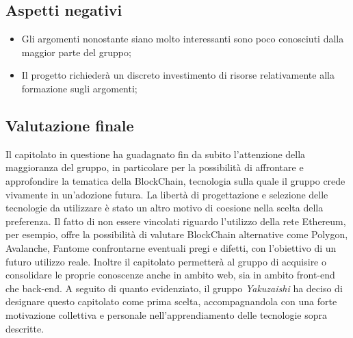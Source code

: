 \subsection{Aspetti negativi}
\begin{itemize}
	\item Gli argomenti nonostante siano molto interessanti sono poco conosciuti dalla maggior parte del gruppo;
	\item Il progetto richiederà un discreto investimento di risorse relativamente alla formazione sugli argomenti;
\end{itemize}

\subsection{Valutazione finale}
Il capitolato in questione ha guadagnato fin da subito l'attenzione della maggioranza del gruppo, in particolare per la possibilità di affrontare e approfondire la tematica della BlockChain, tecnologia sulla quale il gruppo crede vivamente in un'adozione futura.
La libertà di progettazione e selezione delle tecnologie da utilizzare è stato un altro motivo di coesione nella scelta della preferenza. Il fatto di non essere vincolati riguardo l'utilizzo della rete Ethereum, per esempio, offre la possibilità di valutare BlockChain
alternative come Polygon\glo, Avalanche\glo, Fantom\glo e confrontarne eventuali pregi e difetti, con l'obiettivo di un futuro utilizzo reale.
\newline
Inoltre il capitolato permetterà al gruppo di acquisire o consolidare le proprie conoscenze anche in ambito web, sia in ambito front-end che back-end. A seguito di quanto evidenziato, il gruppo \textit{Yakuzaishi} ha deciso di designare questo capitolato come prima scelta,
accompagnandola con una forte motivazione collettiva e personale nell'apprendiamento delle tecnologie sopra descritte.

